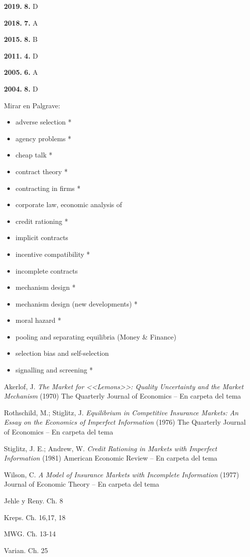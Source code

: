 \documentclass{nuevotema}
\begin{document}
\notas

\textbf{2019.} \textbf{8.} D

\textbf{2018.} \textbf{7.} A

\textbf{2015.} \textbf{8.} B

\textbf{2011.} \textbf{4.} D

\textbf{2005.} \textbf{6.} A

\textbf{2004.} \textbf{8.} D


\bibliografia

Mirar en Palgrave:
\begin{itemize}
	\item adverse selection *
	\item agency problems *
	\item cheap talk * 
	\item contract theory *
	\item contracting in firms *
	\item corporate law, economic analysis of
	\item credit rationing *
	\item implicit contracts
	\item incentive compatibility *
	\item incomplete contracts
	\item mechanism design *
	\item mechanism design (new developments) *
	\item moral hazard *
	\item pooling and separating equilibria (Money \& Finance)
	\item selection bias and self-selection
	\item signalling and screening *
\end{itemize}

Akerlof, J. \textit{The Market for <<Lemons>>: Quality Uncertainty and the Market Mechanism} (1970) The Quarterly Journal of Economics -- En carpeta del tema

Rothschild, M.; Stiglitz, J. \textit{Equilibrium in Competitive Insurance Markets: An Essay on the Economics of Imperfect Information} (1976) The Quarterly Journal of Economics -- En carpeta del tema

Stiglitz, J. E.; Andrew, W. \textit{Credit Rationing in Markets with Imperfect Information} (1981) American Economic Review -- En carpeta del tema

Wilson, C. \textit{A Model of Insurance Markets with Incomplete Information} (1977) Journal of Economic Theory -- En carpeta del tema

Jehle y Reny. Ch. 8

Kreps. Ch. 16,17, 18

MWG. Ch. 13-14 

Varian. Ch. 25
\end{document}

